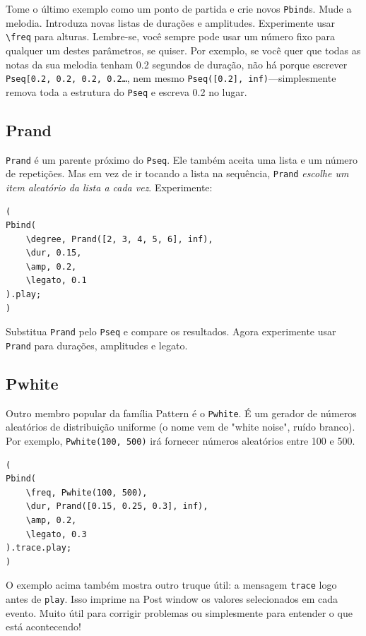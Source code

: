 Tome o último exemplo como um  ponto de partida e crie novos \texttt{Pbind}s. Mude a melodia. Introduza novas listas de durações e amplitudes. Experimente usar \texttt{\textbackslash freq} para alturas. Lembre-se, você sempre pode usar um número fixo para qualquer um destes parâmetros, se quiser. Por exemplo, se você quer que todas as notas da sua melodia tenham 0.2 segundos de duração, não há porque escrever \texttt{Pseq[0.2, 0.2, 0.2, 0.2\dots}, nem mesmo \texttt{Pseq([0.2], inf)}---simplesmente remova toda a estrutura do \texttt{Pseq} e escreva 0.2 no lugar.

\subsection{Prand}

\texttt{Prand} é um parente próximo do \texttt{Pseq}. Ele também aceita uma lista e um número de repetições. Mas em vez de ir tocando a lista na sequência, \texttt{Prand} \emph{escolhe um item aleatório da lista a cada vez}. Experimente:

 
\begin{lstlisting}[style=SuperCollider-IDE, basicstyle=\scttfamily\footnotesize]
(
Pbind(
	\degree, Prand([2, 3, 4, 5, 6], inf),
	\dur, 0.15,
	\amp, 0.2,
	\legato, 0.1
).play;
)
\end{lstlisting}
 

Substitua \texttt{Prand} pelo \texttt{Pseq} e compare os resultados. Agora experimente usar \texttt{Prand} para durações, amplitudes e legato.

\subsection{Pwhite}

Outro membro popular da família Pattern é o \texttt{Pwhite}. É um gerador de números aleatórios de distribuição uniforme (o nome vem de "white noise", ruído branco). Por exemplo, \texttt{Pwhite(100, 500)} irá fornecer números aleatórios entre 100 e 500.
 
\begin{lstlisting}[style=SuperCollider-IDE, basicstyle=\scttfamily\footnotesize]
(
Pbind(
	\freq, Pwhite(100, 500),
	\dur, Prand([0.15, 0.25, 0.3], inf),
	\amp, 0.2,
	\legato, 0.3
).trace.play;
)
\end{lstlisting}
 

O exemplo acima também mostra outro truque útil: a mensagem \texttt{trace} logo antes de \texttt{play}. Isso imprime na Post window os valores selecionados em cada evento. Muito útil para corrigir problemas ou simplesmente para entender o que está acontecendo!

